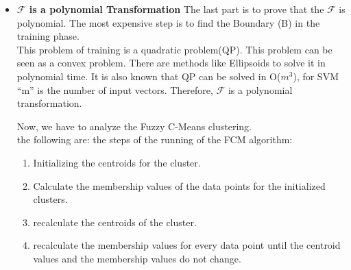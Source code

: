 \documentclass[12pt,a4paper,final]{report}
\begin{document}
{{{{{\begin{itemize}
Substituting $\Delta_{i,j}$ = $y_iy_j\alpha_i\alpha_j$ for simplification purpose \\
\begin{equation}
\sum_{k \in A'}\Big[\frac{1}{q^2}\sum_{i=1}^{m}\sum_{j=1}^{m}\Delta_{i,j}k(x_i,x_j)\Big] = \sum_{i=1}^{m}\sum_{j=1}^{m}\Delta_{i,j}k^*(x_i,x_j)
\end{equation}
Cancelling common terms,
\begin{equation}
\frac{1}{q^2}\sum_{k \in A'}{}k(x_i,x_j)=k^*(x_i,x_j)
\end{equation}
Thus, 
\begin{equation}
\sum_{k \in A'}s(k) = B \leftrightarrow k^*(x_i,x_j) = \frac{1}{q^2}\sum_{k \in A'}k(x_i,x_j)
\end{equation}
This implies that the transformed subset problem is equivalent to SVM classification using an optimum kernel. Thus, for every instance of (\emph{I')} if the answer is "yes" the answer can be mapped for the instance  of (\emph{I}). \\
\item
\textbf{$\mathcal{F}$ is a polynomial Transformation}
\newline The last part is to prove that the $\mathcal{F}$ is polynomial. The most expensive step is to find the Boundary (B) in the training phase.\\
This problem of training is a quadratic problem(QP). This problem can be seen as a convex problem. There are methods like Ellipsoids to solve it in polynomial time. 
It is also known that QP can be solved in O($m^3$), for  SVM ``m'' is the number of input vectors. Therefore, $\mathcal{F}$ is a polynomial transformation. \\
\newline 

Now, we have to analyze the Fuzzy C-Means clustering.\\
the following are: the steps of the running of the FCM algorithm:
\begin{enumerate}
\item
Initializing the centroids for the cluster.
\item
Calculate the membership values of the data points for the initialized clusters.
\item
recalculate the centroids of the cluster.
\item
recalculate the membership values for every data point until the centroid values and the membership values do not change.
\end{enumerate}


\end{itemize}}}}}}
\end{document}

